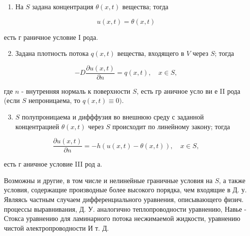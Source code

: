 \documentclass[10pt]{article}
\begin{document}
\begin{enumerate}

  \item На $S$ задана концентрация $\theta(x, t)$ вещества; тогда

\end{enumerate}



\[

u(x, t)=\theta(x, t)

\]



есть г раничное условие I рода.



\begin{enumerate}

  \setcounter{enumi}{1}

  \item Задана плотность потока $q(x, t)$ вещества, входящего в $V$ через $S$; тогда

\end{enumerate}



\[

-D \frac{\partial u(x, t)}{\partial n}=q(x, t), \quad x \in S,

\]



где $n$ - внутренняя нормаль к поверхности $S$, есть гр аничное усло ви е II рода (если $S$ непроницаема, то $q(x, t) \equiv 0)$.



\begin{enumerate}

  \setcounter{enumi}{2}

  \item $S$ полупроницаема и дифффузия во внешнюю среду с заданной концентрацией $\theta(x, t)$ через $S$ происходит по линейному закону; тогда

\end{enumerate}



\[

\frac{\partial u(x, t)}{\partial n}=-h(u(x, t)-\theta(x, t)), \quad x \in S,

\]



есть г аничное условие III род а.



Возможны и другие, в том числе и нелинейные граничные условия на $S$, а также условия, содержащие производные более высокого порядка, чем входящие в Д. у. Являясь частным случаем дифференциального уравнения, описывающего физич. процессы выравнивания, Д. У. аналогично теплопроводности уравнению, Навье - Стокса уравнению для ламинарного потока несжимаемой жидкости, уравнению чистой әлектропроводности И т. Д.
\end{document}
